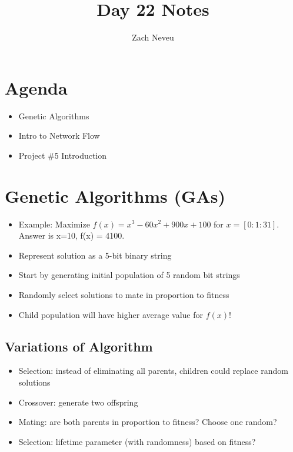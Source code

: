 \documentclass[12pt, letter]{article}
\author{Zach Neveu}
\title{ Day 22 Notes }
\begin{document}
\maketitle

\section{Agenda}%
\label{sec:agenda}

\begin{itemize}
	\item Genetic Algorithms
	\item Intro to Network Flow
	\item Project \#5 Introduction
\end{itemize}


\section{Genetic Algorithms (GAs)}%
\label{sec:genetic_algorithms_gas_}
\begin{itemize}
\item Example: Maximize $f(x) = x^{3}-60x^2+900x+100$ for $x=[0:1:31]$. Answer is x=10, f(x) = 4100. 
\item Represent solution as a 5-bit binary string
\item Start by generating initial population of 5 random bit strings
\item Randomly select solutions to mate in proportion to fitness
\item Child population will have higher average value for $f(x)$!
\end{itemize}

\subsection*{Variations of Algorithm}
\begin{itemize}
	\item Selection: instead of eliminating all parents, children could replace random solutions
	\item Crossover: generate two offspring
	\item Mating: are both parents in proportion to fitness? Choose one random?
	\item Selection: lifetime parameter (with randomness) based on fitness?
\end{itemize}
\end{document}
